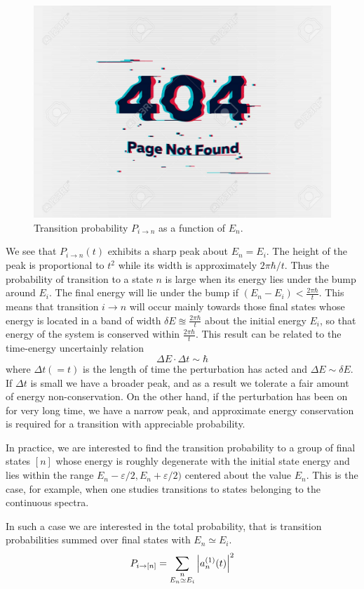 \begin{figure}
	\centering
	\includegraphics[width=0.5\linewidth]{Pictures/not-found.jpg}
	\caption{Transition probability $P_{i\rightarrow n}$ as a function of $E_n$.}
	\label{chapter23.fig2}
\end{figure}
We see that $P_{i \rightarrow n}(t)$ exhibits a sharp peak about $E_n = E_i$. The height of the peak is proportional to $t^2$ while its width is approximately $2 \pi \hbar / t$. Thus the probability of transition to a state $n$ is large when its energy lies under the bump around $E_i$. The final energy will lie under the bump if $(E_n - E_i) < \frac{2 \pi \hbar}{t}$. This means that transition $i \rightarrow n$ will occur mainly towards those final states whose energy is located in a band of width $\delta E \approxeq \frac{2 \pi \hbar}{t}$ about the initial energy $E_i$, so that energy of the system is conserved within $\frac{2 \pi \hbar}{t}$. This result can be related to the time-energy uncertainly relation 
\begin{equation}
\Delta E \cdot \Delta t \sim \hbar
\end{equation}
where $\Delta t (=t)$ is the length of time the perturbation has acted and $\Delta E \sim \delta E$. If $\Delta t$ is small we have a broader peak, and as a result we tolerate a fair amount of energy non-conservation. On the other hand, if the perturbation has been on for very long time, we have a narrow peak, and approximate energy conservation is required for a transition with appreciable probability.

In practice, we are interested to find the transition probability to a group of final states $[n]$ whose energy is roughly degenerate with the initial state energy and lies within the range $E_n - \varepsilon/2, E_n + \varepsilon/2)$ centered about the value $E_n$. This is the case, for example, when one studies transitions to states belonging to the continuous spectra.


In such a case we are interested in the total probability, that is transition probabilities summed over final states with $E_n \simeq E_i$. 
\begin{equation}
\label{chapter23.eqn29}
P_{i \rightarrow [n]} = \sum_{\substack{n \\ E_n\simeq E_i}} \abs{a_n^{(1)}(t)}^2
\end{equation}

